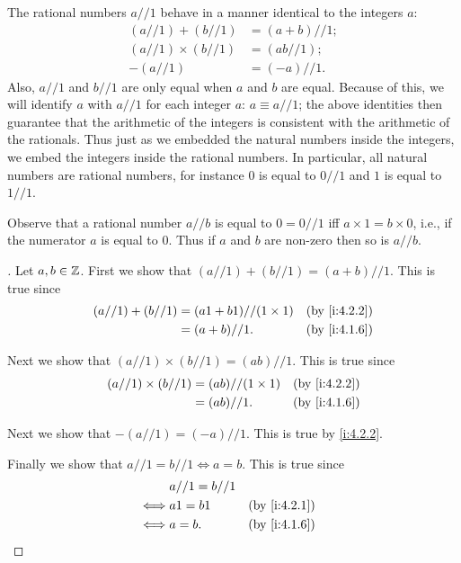 \begin{ac}\label{i:ac:4.2.2}
  The rational numbers \(a // 1\) behave in a manner identical to the integers \(a\):
  \begin{align*}
    (a // 1) + (b // 1)      & = (a + b) // 1; \\
    (a // 1) \times (b // 1) & = (ab // 1);    \\
    -(a // 1)                & = (-a) // 1.
  \end{align*}
  Also, \(a // 1\) and \(b // 1\) are only equal when \(a\) and \(b\) are equal.
  Because of this, we will identify \(a\) with \(a // 1\) for each integer \(a\): \(a \equiv a // 1\);
  the above identities then guarantee that the arithmetic of the integers is consistent with the arithmetic of the rationals.
  Thus just as we embedded the natural numbers inside the integers, we embed the integers inside the rational numbers.
  In particular, all natural numbers are rational numbers, for instance \(0\) is equal to \(0 // 1\) and \(1\) is equal to \(1 // 1\).

  Observe that a rational number \(a // b\) is equal to \(0 = 0 // 1\) iff \(a \times 1 = b \times 0\), i.e., if the numerator \(a\) is equal to \(0\).
  Thus if \(a\) and \(b\) are non-zero then so is \(a // b\).
\end{ac}

\begin{proof}[]
  Let \(a, b \in \mathbb{Z}\).
  First we show that \((a // 1) + (b // 1) = (a + b) // 1\).
  This is true since
  \begin{align*}
    (a // 1) + (b // 1) & = (a1 + b1) // (1 \times 1) &  & \by{i:4.2.2} \\
                        & = (a + b) // 1.             &  & \by{i:4.1.6}
  \end{align*}

  Next we show that \((a // 1) \times (b // 1) = (ab) // 1\).
  This is true since
  \begin{align*}
    (a // 1) \times (b // 1) & = (ab) // (1 \times 1) &  & \by{i:4.2.2} \\
                             & = (ab) // 1.           &  & \by{i:4.1.6}
  \end{align*}

  Next we show that \(-(a // 1) = (-a) // 1\).
  This is true by \cref{i:4.2.2}.

  Finally we show that \(a // 1 = b // 1 \iff a = b\).
  This is true since
  \begin{align*}
         & a // 1 = b // 1                   \\
    \iff & a1 = b1         &  & \by{i:4.2.1} \\
    \iff & a = b.          &  & \by{i:4.1.6}
  \end{align*}
\end{proof}

